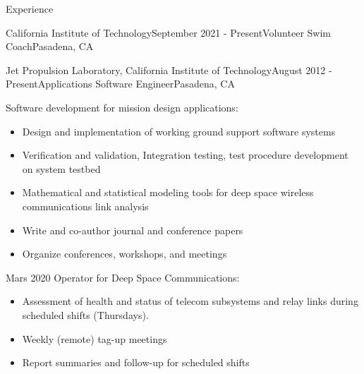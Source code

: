 \documentclass{resume} %
\begin{document}
\begin{rSection}{Experience}
\begin{rSubsection}{California Institute of Technology}{September 2021 - Present}{Volunteer Swim Coach}{Pasadena, CA}
\begin{rSubsection}{Jet Propulsion Laboratory, California Institute of Technology}{August 2012 - Present}{Applications Software Engineer}{Pasadena, CA}
\item Software development for mission design applications:

  \begin{itemize}

     \item Design and implementation of working ground support software systems   
     \item Verification and validation, Integration testing, test procedure development on system testbed
     \item Mathematical and statistical modeling tools for deep space wireless communications link analysis
     \item Write and co-author journal and conference papers 
     \item Organize conferences, workshops, and meetings

  \end{itemize}

\item Mars 2020 Operator for Deep Space Communications:
  \begin{itemize}

     \item Assessment of health and status of telecom subsystems and relay links during scheduled shifts (Thursdays).
     \item Weekly (remote) tag-up meetings
     \item Report summaries and follow-up for scheduled shifts
  \end{itemize}


\end{rSubsection}





\end{rSubsection}
\end{rSection}
\end{document}
